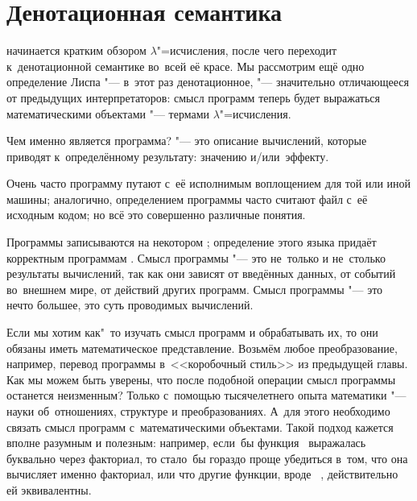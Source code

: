 \begingroup\ChapterFiveSpecials
\chapter{Денотационная семантика}\label{chapter:denotational}

 начинается кратким обзором
$\lambda$"=исчисления, после чего переходит к~денотационной семантике во~всей её
красе. Мы рассмотрим ещё одно определение Лиспа "--- в~этот раз денотационное,
"--- значительно отличающееся от предыдущих интерпретаторов: смысл программ
теперь будет выражаться математическими объектами "--- термами
$\lambda$"=исчисления.

\bigskip

Чем именно является программа?  "--- это описание вычислений,
которые приводят к~определённому результату: значению \hbox{и/или}~эффекту.

Очень часто программу путают с~её исполнимым воплощением для той или иной
машины; аналогично, определением программы часто считают файл с~её исходным
кодом; но всё это совершенно различные понятия.

Программы записываются на некотором ; определение этого языка
придаёт корректным программам . Смысл программы "--- это не~только и
не~столько результаты вычислений, так как они зависят от введённых данных, от
событий во~внешнем мире, от действий других программ. Смысл программы "--- это
нечто большее, это суть проводимых вычислений.

Если мы хотим как"~то изучать смысл программ и обрабатывать их, то они обязаны
иметь математическое представление. Возьмём любое преобразование, например,
перевод программы в~<<коробочный стиль>> из предыдущей главы.
 Как мы можем быть уверены, что
после подобной операции смысл программы останется неизменным? Только с~помощью
тысячелетнего опыта математики "--- науки об~отношениях, структуре и
преобразованиях. А~для этого необходимо связать смысл программ с~математическими
объектами. Такой подход кажется вполне разумным и полезным: например, если~бы
функция~ выражалась буквально через факториал, то стало~бы гораздо
проще убедиться в~том, что она вычисляет именно факториал, или что другие
функции, вроде~
, действительно ей
эквивалентны.

